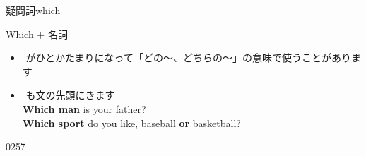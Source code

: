 \documentclass[aspectratio=169,xcolor={dvipsnames,table}]{beamer}
\begin{document}
\begin{frame}[plain]{疑問詞which }\small

\begin{block}{Which $+$ 名詞}\small
\begin{itemize}[square]\small
 \item {}\,\,がひとかたまりになって「どの〜、どちらの～」の意味で使うことがあります
 \item {}\,\,も文の先頭にきます\\%
\hfill{}{\bfseries Which man} is your father?\\
\hfill{}{\bfseries Which sport} do you like, baseball {\bfseries or} basketball?\\
\hfill{}
\end{itemize}
     \end{block}

\mbox{}\hfill{\tiny 0257}\,{\scriptsize {}}

\end{frame}
\end{document}

